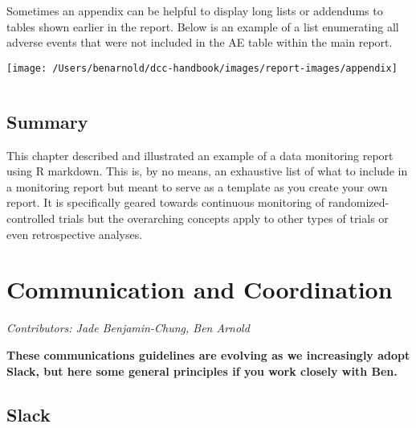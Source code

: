 \documentclass[
]{book}
\begin{document}
Sometimes an appendix can be helpful to display long lists or addendums to tables shown earlier in the report. Below is an example of a list enumerating all adverse events that were not included in the AE table within the main report.

\texttt{[image: /Users/benarnold/dcc-handbook/images/report-images/appendix]}

\(~\)

\hypertarget{summary}{%
\section{Summary}\label{summary}}

This chapter described and illustrated an example of a data monitoring report using R markdown. This is, by no means, an exhaustive list of what to include in a monitoring report but meant to serve as a template as you create your own report. It is specifically geared towards continuous monitoring of randomized-controlled trials but the overarching concepts apply to other types of trials or even retrospective analyses.

\hypertarget{commcoord}{%
\chapter{Communication and Coordination}\label{commcoord}}

\emph{Contributors: Jade Benjamin-Chung, Ben Arnold}

\textbf{These communications guidelines are evolving as we increasingly adopt Slack, but here some general principles if you work closely with Ben.}

\hypertarget{slack}{%
\section{Slack}\label{slack}}
\end{document}
